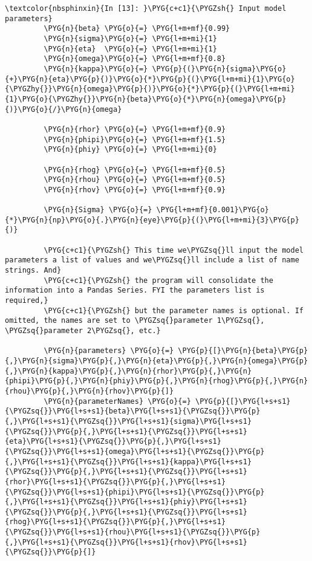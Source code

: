 \documentclass[letterpaper,10pt,openany,oneside,english]{sphinxmanual}
\begin{document}
\begin{Verbatim}[commandchars=\\\{\}]
\textcolor{nbsphinxin}{In [13]: }\PYG{c+c1}{\PYGZsh{} Input model parameters}
         \PYG{n}{beta} \PYG{o}{=} \PYG{l+m+mf}{0.99}
         \PYG{n}{sigma}\PYG{o}{=} \PYG{l+m+mi}{1}
         \PYG{n}{eta}  \PYG{o}{=} \PYG{l+m+mi}{1}
         \PYG{n}{omega}\PYG{o}{=} \PYG{l+m+mf}{0.8}
         \PYG{n}{kappa}\PYG{o}{=} \PYG{p}{(}\PYG{n}{sigma}\PYG{o}{+}\PYG{n}{eta}\PYG{p}{)}\PYG{o}{*}\PYG{p}{(}\PYG{l+m+mi}{1}\PYG{o}{\PYGZhy{}}\PYG{n}{omega}\PYG{p}{)}\PYG{o}{*}\PYG{p}{(}\PYG{l+m+mi}{1}\PYG{o}{\PYGZhy{}}\PYG{n}{beta}\PYG{o}{*}\PYG{n}{omega}\PYG{p}{)}\PYG{o}{/}\PYG{n}{omega}
         
         \PYG{n}{rhor} \PYG{o}{=} \PYG{l+m+mf}{0.9}
         \PYG{n}{phipi}\PYG{o}{=} \PYG{l+m+mf}{1.5}
         \PYG{n}{phiy} \PYG{o}{=} \PYG{l+m+mi}{0}
         
         \PYG{n}{rhog} \PYG{o}{=} \PYG{l+m+mf}{0.5}
         \PYG{n}{rhou} \PYG{o}{=} \PYG{l+m+mf}{0.5}
         \PYG{n}{rhov} \PYG{o}{=} \PYG{l+m+mf}{0.9}
         
         \PYG{n}{Sigma} \PYG{o}{=} \PYG{l+m+mf}{0.001}\PYG{o}{*}\PYG{n}{np}\PYG{o}{.}\PYG{n}{eye}\PYG{p}{(}\PYG{l+m+mi}{3}\PYG{p}{)}
         
         \PYG{c+c1}{\PYGZsh{} This time we\PYGZsq{}ll input the model parameters a list of values and we\PYGZsq{}ll include a list of name strings. And}
         \PYG{c+c1}{\PYGZsh{} the program will consolidate the information into a Pandas Series. FYI the parameters list is required,}
         \PYG{c+c1}{\PYGZsh{} but the parameter names is optional. If omitted, the names are set to \PYGZsq{}parameter 1\PYGZsq{}, \PYGZsq{}parameter 2\PYGZsq{}, etc.}
         
         \PYG{n}{parameters} \PYG{o}{=} \PYG{p}{[}\PYG{n}{beta}\PYG{p}{,}\PYG{n}{sigma}\PYG{p}{,}\PYG{n}{eta}\PYG{p}{,}\PYG{n}{omega}\PYG{p}{,}\PYG{n}{kappa}\PYG{p}{,}\PYG{n}{rhor}\PYG{p}{,}\PYG{n}{phipi}\PYG{p}{,}\PYG{n}{phiy}\PYG{p}{,}\PYG{n}{rhog}\PYG{p}{,}\PYG{n}{rhou}\PYG{p}{,}\PYG{n}{rhov}\PYG{p}{]}
         \PYG{n}{parameterNames} \PYG{o}{=} \PYG{p}{[}\PYG{l+s+s1}{\PYGZsq{}}\PYG{l+s+s1}{beta}\PYG{l+s+s1}{\PYGZsq{}}\PYG{p}{,}\PYG{l+s+s1}{\PYGZsq{}}\PYG{l+s+s1}{sigma}\PYG{l+s+s1}{\PYGZsq{}}\PYG{p}{,}\PYG{l+s+s1}{\PYGZsq{}}\PYG{l+s+s1}{eta}\PYG{l+s+s1}{\PYGZsq{}}\PYG{p}{,}\PYG{l+s+s1}{\PYGZsq{}}\PYG{l+s+s1}{omega}\PYG{l+s+s1}{\PYGZsq{}}\PYG{p}{,}\PYG{l+s+s1}{\PYGZsq{}}\PYG{l+s+s1}{kappa}\PYG{l+s+s1}{\PYGZsq{}}\PYG{p}{,}\PYG{l+s+s1}{\PYGZsq{}}\PYG{l+s+s1}{rhor}\PYG{l+s+s1}{\PYGZsq{}}\PYG{p}{,}\PYG{l+s+s1}{\PYGZsq{}}\PYG{l+s+s1}{phipi}\PYG{l+s+s1}{\PYGZsq{}}\PYG{p}{,}\PYG{l+s+s1}{\PYGZsq{}}\PYG{l+s+s1}{phiy}\PYG{l+s+s1}{\PYGZsq{}}\PYG{p}{,}\PYG{l+s+s1}{\PYGZsq{}}\PYG{l+s+s1}{rhog}\PYG{l+s+s1}{\PYGZsq{}}\PYG{p}{,}\PYG{l+s+s1}{\PYGZsq{}}\PYG{l+s+s1}{rhou}\PYG{l+s+s1}{\PYGZsq{}}\PYG{p}{,}\PYG{l+s+s1}{\PYGZsq{}}\PYG{l+s+s1}{rhov}\PYG{l+s+s1}{\PYGZsq{}}\PYG{p}{]}
         

\end{Verbatim}
\end{document}

